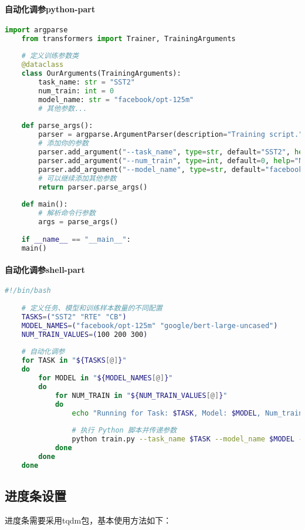 \paragraph{自动化调参python-part}
\begin{lstlisting}[language=python,caption={调参},label=code:shell_tuning_py]
	import argparse
	from transformers import Trainer, TrainingArguments
	
	# 定义训练参数类
	@dataclass
	class OurArguments(TrainingArguments):
		task_name: str = "SST2"
		num_train: int = 0
		model_name: str = "facebook/opt-125m"
		# 其他参数...
	
	def parse_args():
		parser = argparse.ArgumentParser(description="Training script.")
		# 添加你的参数
		parser.add_argument("--task_name", type=str, default="SST2", help="Task name")
		parser.add_argument("--num_train", type=int, default=0, help="Number of training samples")
		parser.add_argument("--model_name", type=str, default="facebook/opt-125m", help="Model name")
		# 可以继续添加其他参数
		return parser.parse_args()
	
	def main():
		# 解析命令行参数
		args = parse_args()
	
	if __name__ == "__main__":
	main()
\end{lstlisting}


\paragraph{自动化调参shell-part}
\begin{lstlisting}[language=sh,caption={调参},label=code:shell_tuning_sh]
	#!/bin/bash
	
	# 定义任务、模型和训练样本数量的不同配置
	TASKS=("SST2" "RTE" "CB")
	MODEL_NAMES=("facebook/opt-125m" "google/bert-large-uncased")
	NUM_TRAIN_VALUES=(100 200 300)
	
	# 自动化调参
	for TASK in "${TASKS[@]}"
	do
		for MODEL in "${MODEL_NAMES[@]}"
		do
			for NUM_TRAIN in "${NUM_TRAIN_VALUES[@]}"
			do
				echo "Running for Task: $TASK, Model: $MODEL, Num_train: $NUM_TRAIN"
	
				# 执行 Python 脚本并传递参数
				python train.py --task_name $TASK --model_name $MODEL --num_train $NUM_TRAIN
			done
		done
	done
\end{lstlisting}

\subsection{进度条设置}
进度条需要采用tqdm包，基本使用方法如下：
